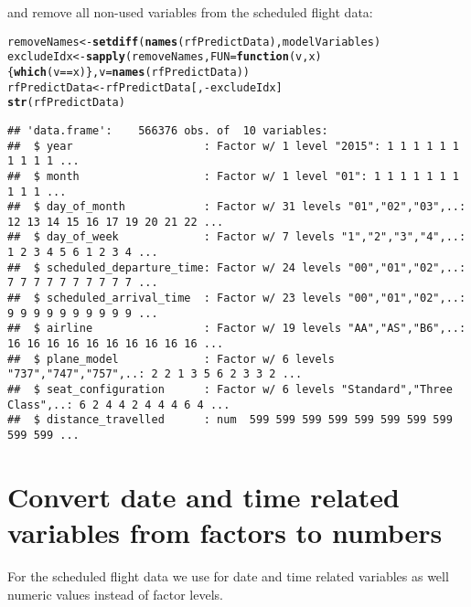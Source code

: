 \documentclass{article}\usepackage[]{graphicx}\usepackage[]{color}
\makeatletter
\newcommand{\hlopt}[1]{\textcolor[rgb]{0,0,0}{#1}}%
\newcommand{\hlstd}[1]{\textcolor[rgb]{0.345,0.345,0.345}{#1}}%
\newcommand{\hlkwa}[1]{\textcolor[rgb]{0.161,0.373,0.58}{\textbf{#1}}}%
\newcommand{\hlkwb}[1]{\textcolor[rgb]{0.69,0.353,0.396}{#1}}%
\newcommand{\hlkwc}[1]{\textcolor[rgb]{0.333,0.667,0.333}{#1}}%
\newcommand{\hlkwd}[1]{\textcolor[rgb]{0.737,0.353,0.396}{\textbf{#1}}}%
\newenvironment{kframe}{%
 \def\at@end@of@kframe{}%
 \ifinner\ifhmode%
  \def\at@end@of@kframe{\end{minipage}}%
  \begin{minipage}{\columnwidth}%
 \fi\fi%
 \def\FrameCommand##1{\hskip\@totalleftmargin \hskip-\fboxsep
 \colorbox{shadecolor}{##1}\hskip-\fboxsep
     \hskip-\linewidth \hskip-\@totalleftmargin \hskip\columnwidth}%
 \MakeFramed {\advance\hsize-\width
   \@totalleftmargin\z@ \linewidth\hsize
   \@setminipage}}%
 {\par\unskip\endMakeFramed%
 \at@end@of@kframe}
\newenvironment{knitrout}{}{} %
\makeatother
\begin{document}
and remove all non-used variables from the scheduled flight data:
\begin{knitrout}
\color{fgcolor}\begin{kframe}
\begin{alltt}
\hlstd{removeNames} \hlkwb{<-} \hlkwd{setdiff}\hlstd{(}\hlkwd{names}\hlstd{(rfPredictData), modelVariables)}
\hlstd{excludeIdx} \hlkwb{<-} \hlkwd{sapply}\hlstd{(removeNames,} \hlkwc{FUN}\hlstd{=}\hlkwa{function}\hlstd{(}\hlkwc{v}\hlstd{,} \hlkwc{x}\hlstd{)\{} \hlkwd{which}\hlstd{(v}\hlopt{==}\hlstd{x)\},} \hlkwc{v}\hlstd{=}\hlkwd{names}\hlstd{(rfPredictData))}
\hlstd{rfPredictData} \hlkwb{<-} \hlstd{rfPredictData[,}\hlopt{-}\hlstd{excludeIdx]}
\hlkwd{str}\hlstd{(rfPredictData)}
\end{alltt}
\begin{verbatim}
## 'data.frame':	566376 obs. of  10 variables:
##  $ year                    : Factor w/ 1 level "2015": 1 1 1 1 1 1 1 1 1 1 ...
##  $ month                   : Factor w/ 1 level "01": 1 1 1 1 1 1 1 1 1 1 ...
##  $ day_of_month            : Factor w/ 31 levels "01","02","03",..: 12 13 14 15 16 17 19 20 21 22 ...
##  $ day_of_week             : Factor w/ 7 levels "1","2","3","4",..: 1 2 3 4 5 6 1 2 3 4 ...
##  $ scheduled_departure_time: Factor w/ 24 levels "00","01","02",..: 7 7 7 7 7 7 7 7 7 7 ...
##  $ scheduled_arrival_time  : Factor w/ 23 levels "00","01","02",..: 9 9 9 9 9 9 9 9 9 9 ...
##  $ airline                 : Factor w/ 19 levels "AA","AS","B6",..: 16 16 16 16 16 16 16 16 16 16 ...
##  $ plane_model             : Factor w/ 6 levels "737","747","757",..: 2 2 1 3 5 6 2 3 3 2 ...
##  $ seat_configuration      : Factor w/ 6 levels "Standard","Three Class",..: 6 2 4 4 2 4 4 4 6 4 ...
##  $ distance_travelled      : num  599 599 599 599 599 599 599 599 599 599 ...
\end{verbatim}
\end{kframe}
\end{knitrout}

\section{Convert date and time related variables from factors to numbers}

For the scheduled flight data we use for date and time related variables as well numeric values instead of factor levels.
\end{document}
